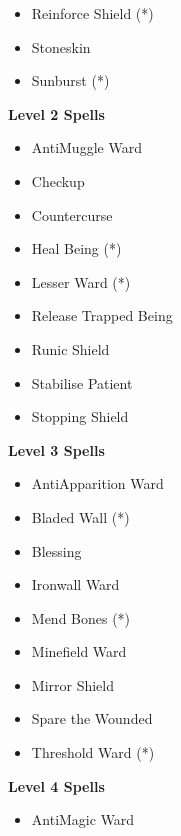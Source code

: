 \begin{multicols}{4}
{\begin{itemize}[itemsep=0em]
\item Reinforce Shield (*) 

\item Stoneskin

\item Sunburst (*) 


\end{itemize}
\textbf{Level 2 Spells}
\begin{itemize}[itemsep=0em]
\renewcommand\labelitemi{-}
\item Anti\minus{}Muggle Ward

\item Checkup

\item Countercurse

\item Heal Being (*) 

\item Lesser Ward (*) 

\item Release Trapped Being

\item Runic Shield

\item Stabilise Patient

\item Stopping Shield


\end{itemize}
\textbf{Level 3 Spells}
\begin{itemize}[itemsep=0em]
\renewcommand\labelitemi{-}
\item Anti\minus{}Apparition Ward

\item Bladed Wall (*) 

\item Blessing

\item Ironwall Ward

\item Mend Bones (*) 

\item Minefield Ward

\item Mirror Shield

\item Spare the Wounded

\item Threshold Ward (*) 


\end{itemize}
\textbf{Level 4 Spells}
\begin{itemize}[itemsep=0em]
\renewcommand\labelitemi{-}
\item Anti\minus{}Magic Ward


\end{itemize}}
\end{multicols}
